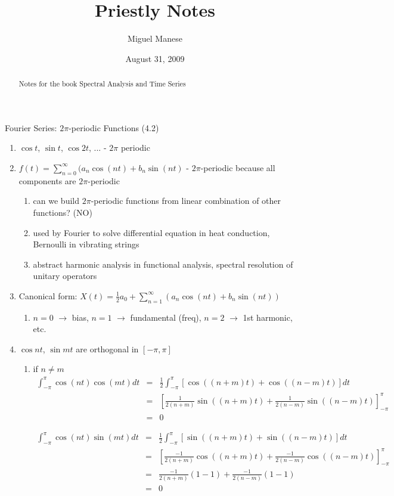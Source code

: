 \documentclass{article}
\title{Priestly Notes}
\author{Miguel Manese}
\date{August 31, 2009}
\newcommand{\intpi}{\int_{-\pi}^{\pi}}
\begin{document}
\maketitle
\begin{abstract}
Notes for the book Spectral Analysis and Time Series
\end{abstract}

\begin{section}{Fourier Series: $2\pi$-periodic Functions (4.2)}
\begin{enumerate}
\item $\cos t$, $\sin t$, $\cos 2t$, ... - $2\pi$ periodic 
\item $f(t) = \sum_{n=0}^{\infty} (a_{n}\cos(nt) + b_{n}\sin(nt)$ - 
  $2\pi$-periodic because all components are $2\pi$-periodic
    \begin{enumerate}
    \item can we build $2\pi$-periodic functions from linear combination of
    other functions? (NO)
    \item used by Fourier to solve differential equation in heat conduction,
    Bernoulli in vibrating strings
    \item abstract harmonic analysis in functional analysis, spectral
    resolution of unitary operators
    \end{enumerate}
\item \label{fseries} Canonical form: $X(t) = \frac{1}{2}a_{0} + 
  \sum_{n=1}^{\infty} (a_{n} \cos(nt) + b_{n} \sin(nt))$
    \begin{enumerate}
    \item $n = 0$ $\rightarrow$ bias, $n = 1$ $\to$ fundamental (freq),
    $n = 2$ $\to$ 1st harmonic, etc.
    \end{enumerate}
\item \label{ortho1} $\cos nt$, $\sin mt$ are orthogonal in $[-\pi, \pi]$
    \begin{enumerate}
    \item if $n \neq m$
    \begin{eqnarray}
    \intpi \cos(nt)\cos(mt) dt & = & \frac{1}{2} \intpi [\cos((n+m)t) + 
                 \cos((n-m)t)] dt \nonumber \\
     & = & \left[ \frac{1}{2(n+m)} \sin((n+m)t) +
           \frac{1}{2(n-m)} \sin((n-m)t) \right]_{-\pi}^{\pi} \nonumber \\
    & = & 0 \nonumber
    \end{eqnarray}

    \begin{eqnarray}
    \intpi \cos(nt)\sin(mt) dt & = & \frac{1}{2} \intpi [\sin((n+m)t) +
         \sin((n-m)t)] dt \nonumber \\
     & = & \left[ \frac{-1}{2(n+m)} \cos((n+m)t) + 
                  \frac{-1}{2(n-m)} \cos((n-m)t) \right]_{-\pi}^{\pi} \nonumber\\
     & = & \frac{-1}{2(n+m)} (1 - 1) + \frac{-1}{2(n-m)} (1 - 1) \nonumber\\
     & = & 0 \nonumber
     \end{eqnarray}


\end{enumerate}
\end{enumerate}
\end{section}
\end{document}

